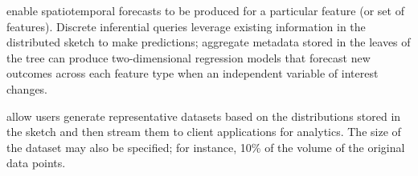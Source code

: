 \begin{description}[leftmargin=*]

\item[Inferential Queries] enable spatiotemporal forecasts to be produced for a particular feature (or set of features). Discrete inferential queries leverage existing information in the distributed sketch to make predictions; aggregate metadata stored in the leaves of the tree can produce two-dimensional regression models that forecast new outcomes across each feature type when an independent variable of interest changes.


\item[Synthetic Data Queries] allow users generate representative datasets based on the distributions stored in the sketch and then stream them to client applications for analytics. The size of the dataset may also be specified; for instance, 10\% of the volume of the original data points.
\end{description}
%
